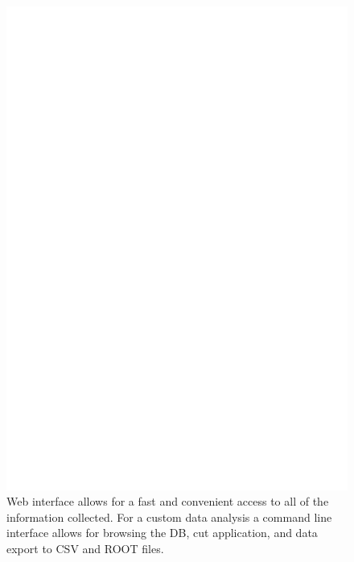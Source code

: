 \documentclass[a4paper]{jpconf}
\begin{document}
\begin{figure}
  \centering
  \includegraphics[width=\columnwidth]{webcapture.eps}
  \caption{Web interface allows for a fast and convenient access to all of the information collected. For a custom data analysis a command line interface allows for browsing the DB, cut application, and data export to CSV and ROOT files.}
  \label{fig:webcapture}
\end{figure}
\end{document}
